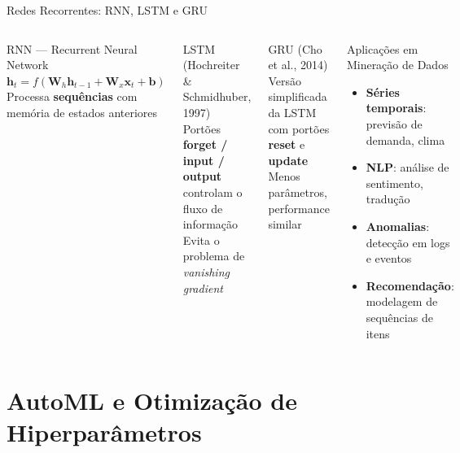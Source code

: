 \documentclass[aspectratio=169]{beamer}
\begin{document}
\begin{frame}{Redes Recorrentes: RNN, LSTM e GRU}
    \begin{columns}
        \begin{block}{RNN — Recurrent Neural Network}
            $\mathbf{h}_t = f\!\left(\mathbf{W}_h \mathbf{h}_{t-1} + \mathbf{W}_x \mathbf{x}_t + \mathbf{b}\right)$\\
            Processa \textbf{sequências} com memória de estados anteriores
        \end{block}
        \begin{block}{LSTM (Hochreiter \& Schmidhuber, 1997)}
            Portões \textbf{forget / input / output} controlam o fluxo de informação\\
            Evita o problema de \textit{vanishing gradient}
        \end{block}
        \begin{block}{GRU (Cho et al., 2014)}
            Versão simplificada da LSTM com portões \textbf{reset} e \textbf{update}\\
            Menos parâmetros, performance similar
        \end{block}
        \begin{block}{Aplicações em Mineração de Dados}
            \begin{itemize}
                \item \textbf{Séries temporais}: previsão de demanda, clima
                \item \textbf{NLP}: análise de sentimento, tradução
                \item \textbf{Anomalias}: detecção em logs e eventos
                \item \textbf{Recomendação}: modelagem de sequências de itens
            \end{itemize}
        \end{block}
    \end{columns}
\end{frame}



\section{AutoML e Otimização de Hiperparâmetros}
\end{document}
